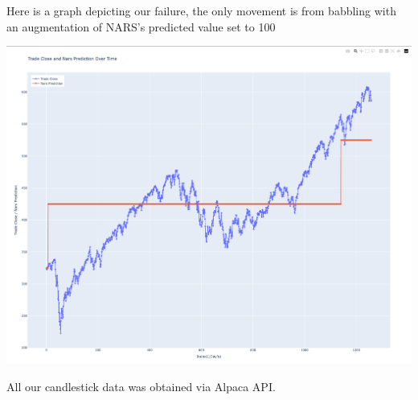 \documentclass{article}
\begin{document}
\vspace{3mm}
Here is a graph depicting our failure, the only movement is from babbling with an augmentation
of NARS's predicted value set to 100
\begin{center}
	\includegraphics[width=\textwidth]{screenshot.png}
\end{center}

All our candlestick data was obtained via Alpaca API.
\end{document}
